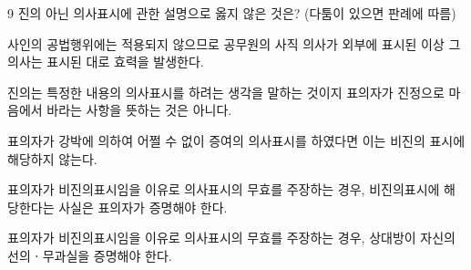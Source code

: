 \begin{question}{9}
진의 아닌 의사표시에 관한 설명으로 옳지 않은 것은? (다툼이 있으면 판례에 따름)
\begin{choices}
  \item 사인의 공법행위에는 적용되지 않으므로 공무원의 사직 의사가 외부에 표시된 이상 그 의사는 표시된 대로 효력을 발생한다.
  \item 진의는 특정한 내용의 의사표시를 하려는 생각을 말하는 것이지 표의자가 진정으로 마음에서 바라는 사항을 뜻하는 것은 아니다.
  \item 표의자가 강박에 의하여 어쩔 수 없이 증여의 의사표시를 하였다면 이는 비진의 표시에 해당하지 않는다.
  \item 표의자가 비진의표시임을 이유로 의사표시의 무효를 주장하는 경우, 비진의표시에 해당한다는 사실은 표의자가 증명해야 한다.
  \item 표의자가 비진의표시임을 이유로 의사표시의 무효를 주장하는 경우, 상대방이 자신의 선의ㆍ무과실을 증명해야 한다.
\end{choices}
\end{question}
